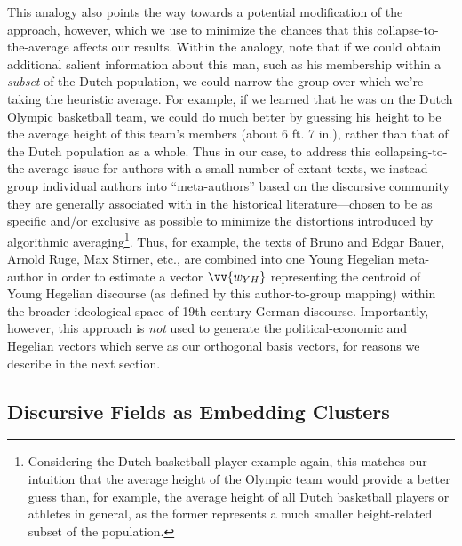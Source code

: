 \documentclass[11pt]{article}
\begin{document}
This analogy also points the way towards a potential modification of the approach, however, which we use to minimize the chances that this collapse-to-the-average affects our results. Within the analogy, note that if we could obtain additional salient information about this man, such as his membership within a \textit{subset} of the Dutch population, we could narrow the group over which we're taking the heuristic average. For example, if we learned that he was on the Dutch Olympic basketball team, we could do much better by guessing his height to be the average height of this team's members (about 6 ft. 7 in.), rather than that of the Dutch population as a whole. Thus in our case, to address this collapsing-to-the-average issue for authors with a small number of extant texts, we instead group individual authors into ``meta-authors'' based on the discursive community they are generally associated with in the historical literature---chosen to be as specific and/or exclusive as possible to minimize the distortions introduced by algorithmic averaging\footnote{Considering the Dutch basketball player example again, this matches our intuition that the average height of the Olympic team would provide a better guess than, for example, the average height of all Dutch basketball players or athletes in general, as the former represents a much smaller height-related subset of the population.}. Thus, for example, the texts of Bruno and Edgar Bauer, Arnold Ruge, Max Stirner, etc., are combined into one Young Hegelian meta-author in order to estimate a vector $\vv{w_{YH}}$ representing the centroid of Young Hegelian discourse (as defined by this author-to-group mapping) within the broader ideological space of 19th-century German discourse. Importantly, however, this approach is \textit{not} used to generate the political-economic and Hegelian vectors which serve as our orthogonal basis vectors, for reasons we describe in the next section.

\subsection{Discursive Fields as Embedding Clusters}\label{sec:embedding-clusters}
\end{document}
